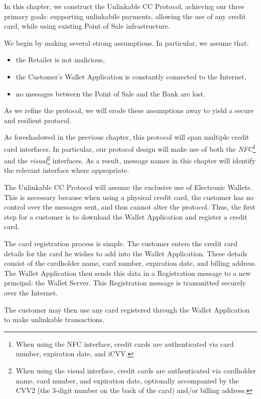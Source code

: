 In this chapter, we construct the Unlinkable CC Protocol, achieving our three primary goals:
supporting unlinkabile payments,
allowing the use of any credit card,
while using existing Point of Sale infrastructure.

We begin by making several strong assumptions.
In particular, we assume that:
\begin{itemize}
\item the Retailer is not malicious,
\item the Customer's Wallet Application is constantly connected to the Internet,
\item no messages between the Point of Sale and the Bank are lost.
\end{itemize}
As we refine the protocol, we will erode these assumptions away to yield a secure and resilient protocol.

As foreshadowed in the previous chapter, this protocol will span multiple credit card interfaces.
In particular, our protocol design will make use of both the \emph{NFC}\footnote{
	When using the NFC interface, credit cards are authenticated via card number, expiration date, and iCVV.
} and the \emph{visual}\footnote{
	When using the visual interface, credit cards are authenticated via cardholder name, card number, and expiration date,
	optionally accompanied by the CVV2 (the 3-digit number on the back of the card) and/or billing address.
} interfaces.
As a result, message names in this chapter will identify the relevant interface where appropriate.

The Unlinkable CC Protocol will assume the exclusive use of Electronic Wallets.
This is necessary because when using a physical credit card, the customer has no control over the messages sent,
    and thus cannot alter the protocol.
Thus, the first step for a customer is to download the Wallet Application and register a credit card.

The card registration process is simple.
The customer enters the credit card details for the card he wishes to add into the Wallet Application.
These details consist of the cardholder name, card number, expiration date, and billing address.
The Wallet Application then sends this data in a Registration message to a new principal: the Wallet Server.
This Registration message is transmitted securely over the Internet.

The customer may then use any card registered through the Wallet Application to make unlinkable transactions.
